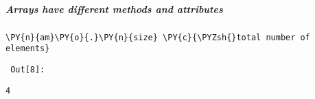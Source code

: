     \subparagraph{Arrays have different methods and attributes}



{\par%
\vspace{-1\baselineskip}%
}%
\begin{notebookcell}[8]%
\begin{addmargin}[\cellleftmargin]{0em}%
{\smaller%
\par%
%
\vspace{-1\smallerfontscale}%
\begin{Verbatim}[commandchars=\\\{\}]
\PY{n}{am}\PY{o}{.}\PY{n}{size} \PY{c}{\PYZsh{}total number of elements}
\end{Verbatim}
%
\par%
\vspace{-1\smallerfontscale}}%
\end{addmargin}
\end{notebookcell}

\par\vspace{1\smallerfontscale}%
    
        {\par%
        \vspace{-1\smallerfontscale}%
        \noindent%
        \begin{minipage}{\cellleftmargin}%
    \hfill%
    {\smaller%
    \tt%
    \color{nbframe-out-prompt}%
    Out[8]:}%
    \hspace{\inputpadding}%
    \hspace{0em}%
    \hspace{3pt}%
    \end{minipage}%
        }%
    \begin{addmargin}[\cellleftmargin]{0em}%
    {\smaller%
    \vspace{-1\smallerfontscale}%
    
    
    
    \begin{verbatim}
4
    \end{verbatim}

    
}%
    \end{addmargin}%

